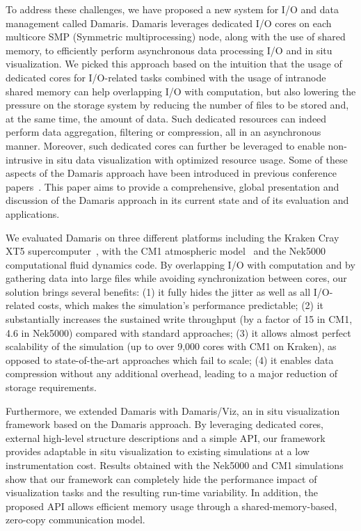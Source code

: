 To address these challenges, we have proposed a new system for I/O and data management called Damaris. Damaris leverages dedicated I/O cores on each multicore SMP (Symmetric multiprocessing) node, along with the use of shared memory, to efficiently perform asynchronous data processing I/O and in situ visualization. We picked this approach based on the intuition that the usage of dedicated cores for I/O-related tasks combined with the usage of intranode shared memory can help overlapping I/O with computation, but also lowering the pressure on the storage system by reducing the number of files to be stored and, at the same time, the amount of data. Such dedicated resources can indeed perform data aggregation, filtering or compression, all in an asynchronous manner. Moreover, such dedicated cores can further be leveraged to enable non-intrusive in situ data visualization with optimized resource usage. Some of these aspects of the Damaris approach have been introduced in previous conference papers~\cite{dorier2012damaris,dorier2013damarisviz}. This paper aims to provide a comprehensive, global presentation and discussion of the Damaris approach in its current state and of its evaluation and applications.

We evaluated Damaris on three different platforms including the Kraken Cray XT5 supercomputer~\cite{kraken}, with the CM1 atmospheric model~\cite{bryan2002benchmark} and the Nek5000~\cite{nek5000} computational fluid dynamics code. By overlapping I/O with computation and by gathering data into large files while avoiding synchronization between cores, our solution brings several benefits: (1) it fully hides the jitter as well as all I/O-related costs, which makes the simulation’s performance predictable; (2) it substantially increases the sustained write throughput (by a factor of 15 in CM1, 4.6 in Nek5000) compared with standard approaches; (3) it allows almost perfect scalability of the  simulation (up to over 9,000 cores with CM1 on Kraken), as opposed to state-of-the-art approaches which fail to scale; (4) it enables data compression without any additional overhead, leading to a major reduction of storage requirements.

Furthermore, we extended Damaris with Damaris/Viz, an in situ visualization framework based on the Damaris approach. By leveraging dedicated cores, external high-level structure descriptions and a simple API, our framework provides adaptable in situ visualization to existing simulations at a low instrumentation cost. Results obtained with the Nek5000 and CM1 simulations show that our framework can completely hide the performance impact of visualization tasks and the resulting run-time variability. In addition, the proposed API allows efficient memory usage through a shared-memory-based, zero-copy communication model.

